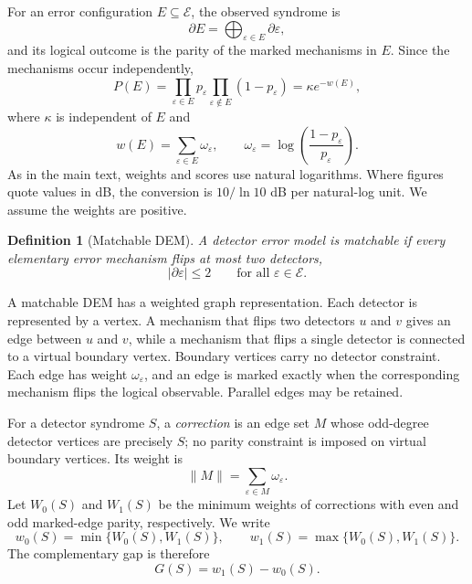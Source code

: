 \documentclass[
    reprint,
    amsmath,amssymb,
    nofootinbib,
    superscriptaddress,
    aps,
    noeprint,
    longbibliography,
    prl
]{revtex4-2}
\theoremstyle{plain}
\newtheorem{definition}[theorem]{Definition}
\begin{document}
For an error configuration $E\subseteq\mathcal E$, the observed syndrome is
\begin{equation}
    \partial E
    =
    \bigoplus_{\varepsilon\in E}\partial\varepsilon ,
\end{equation}
and its logical outcome is the parity of the marked mechanisms in $E$. Since the mechanisms occur
independently,
\begin{equation}
    P(E)
    =
    \prod_{\varepsilon\in E}p_\varepsilon
    \prod_{\varepsilon\notin E}(1-p_\varepsilon)
    =
    \kappa e^{-w(E)},
\end{equation}
where $\kappa$ is independent of $E$ and
\begin{equation}
    w(E)
    =
    \sum_{\varepsilon\in E}\omega_\varepsilon,
    \qquad
    \omega_\varepsilon
    =
    \log\!\left(\frac{1-p_\varepsilon}{p_\varepsilon}\right).
    \label{seq:dem-weight}
\end{equation}
As in the main text, weights and scores use natural logarithms. Where figures quote values in dB,
the conversion is $10/\ln 10$ dB per natural-log unit. We assume the weights are positive.

\begin{definition}[Matchable DEM]
    A detector error model is \emph{matchable} if every elementary error mechanism flips at most two
    detectors,
    \begin{equation}
        |\partial\varepsilon|\leq 2
        \qquad
        \text{for all }\varepsilon\in\mathcal E .
    \end{equation}
\end{definition}

A matchable DEM has a weighted graph representation. Each detector is represented by a vertex. A
mechanism that flips two detectors $u$ and $v$ gives an edge between $u$ and $v$, while a mechanism
that flips a single detector is connected to a virtual boundary vertex. Boundary vertices carry no
detector constraint. Each edge has weight $\omega_\varepsilon$, and an edge is marked exactly when
the corresponding mechanism flips the logical observable. Parallel edges may be retained.

For a detector syndrome $S$, a \emph{correction} is an edge set $M$ whose odd-degree detector
vertices are precisely $S$; no parity constraint is imposed on virtual boundary vertices. Its weight
is
\begin{equation}
    \|M\|
    =
    \sum_{\varepsilon\in M}\omega_\varepsilon .
\end{equation}
Let $W_0(S)$ and $W_1(S)$ be the minimum weights of corrections with even and odd marked-edge
parity, respectively. We write
\begin{equation}
    w_0(S)=\min\{W_0(S),W_1(S)\},
    \qquad
    w_1(S)=\max\{W_0(S),W_1(S)\}.
\end{equation}
The complementary gap is therefore
\begin{equation}
    G(S)=w_1(S)-w_0(S).
\end{equation}
\end{document}
